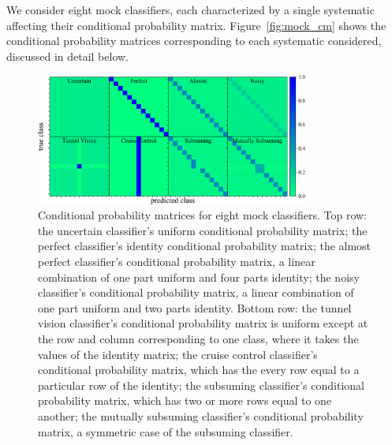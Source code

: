 We consider eight mock classifiers, each characterized by a single systematic affecting their conditional probability matrix.
Figure~\ref{fig:mock_cm} shows the conditional probability matrices corresponding to each systematic considered, discussed in detail below.
\begin{figure}
	\begin{center}
    \includegraphics[width=0.8\textwidth]{./fig/all_sim_cm.png}
		\caption{Conditional probability matrices for eight mock classifiers.
		Top row:
		the uncertain classifier's uniform conditional probability matrix;
		the perfect classifier's identity conditional probability matrix;
		the almost perfect classifier's conditional probability matrix, a linear combination of one part uniform and four parts identity;
		the noisy classifier's conditional probability matrix, a linear combination of one part uniform and two parts identity.
		Bottom row:
		the tunnel vision classifier's conditional probability matrix is uniform except at the row and column corresponding to one class, where it takes the values of the identity matrix;
		the cruise control classifier's conditional probability matrix, which has the every row equal to a particular row of the identity;
		the subsuming classifier's conditional probability matrix, which has two or more rows equal to one another;
		the mutually subsuming classifier's conditional probability matrix, a symmetric case of the subsuming classifier.
}
\end{center}
\end{figure}
